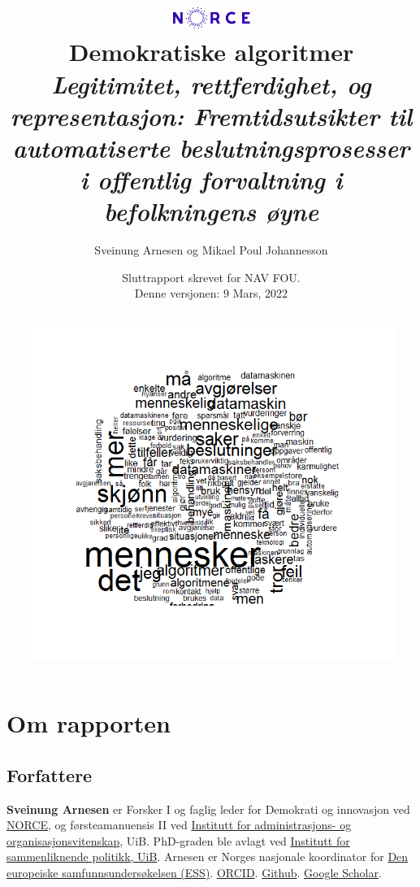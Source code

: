 \documentclass[
  12pt,
  a4paper, 12pt]{article}
\title{\includegraphics[width=1in,height=\textheight]{norce_logo.png}\\
\bigskip  
Demokratiske algoritmer\\
\bigskip   
\large
\emph{Legitimitet, rettferdighet, og representasjon: Fremtidsutsikter til automatiserte beslutningsprosesser i offentlig forvaltning i befolkningens øyne}}
\author{Sveinung Arnesen og Mikael Poul Johannesson}
\date{Sluttrapport skrevet for NAV FOU.\\
Denne versjonen: 9 Mars, 2022}
\begin{document}
\maketitle
\begin{abstract}
\includegraphics{figs/png/nav_ordsky.png}
\end{abstract}

\newpage
\tableofcontents

\newpage

\listoffigures

\newpage

\hypertarget{om-rapporten}{%
\section*{Om rapporten}\label{om-rapporten}}

\hypertarget{forfattere}{%
\subsection*{Forfattere}\label{forfattere}}

\textbf{Sveinung Arnesen} er Forsker I og faglig leder for Demokrati og innovasjon ved \href{https://www.norceresearch.no/personer/sveinung-arnesen}{NORCE}, og førsteamanuensis II ved \href{https://www.uib.no/personer/Sveinung.Arnesen}{Institutt for administrasjons- og organisasjonsvitenskap}, UiB.
PhD-graden ble avlagt ved \href{https://www.uib.no/sampol}{Institutt for sammenliknende politikk, UiB}.
Arnesen er Norges nasjonale koordinator for \href{europeansocialsurvey.org}{Den europeiske samfunnsundersøkelsen (ESS)}. \href{https://orcid.org/0000-0002-2825-0664}{ORCID}. \href{https://github.com/SveinungA/}{Github}. \href{https://scholar.google.com/citations?user=xz8JwjAAAAAJ\&hl=no\&oi=ao}{Google Scholar}.
\end{document}
